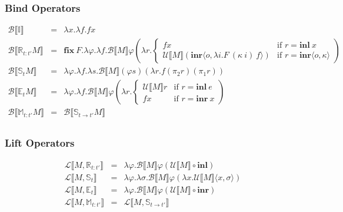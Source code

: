 \documentclass{article}[11pt]
\begin{document}
\subsubsection{Bind Operators}
\begin{eqnarray*}
\mathcal{B}\llbracket{}\mathbb{I}\rrbracket &=& \lambda x . \lambda f . f x\\
\mathcal{B}\llbracket{}\mathbb{R}_{t:t'}M\rrbracket &=& \mathbf{fix}~ F . \lambda \varphi . \lambda f . \mathcal{B}\llbracket{}M\rrbracket \varphi \left(\lambda r . \begin{cases}f x&\text{if } r = \mathbf{inl}~ x\\\mathcal{U}\llbracket{}M\rrbracket (\mathbf{inr} \langle o,\lambda i . F~ (\kappa~ i)~ f\rangle)&\text{if } r = \mathbf{inr} \langle{}o,\kappa\rangle\end{cases}\right)\\
\mathcal{B}\llbracket{}\mathbb{S}_t M\rrbracket &=& \lambda \varphi . \lambda f . \lambda s . \mathcal{B}\llbracket{}M\rrbracket (\varphi s) (\lambda r . f (\pi_2r) (\pi_1 r))\\
\mathcal{B}\llbracket{}\mathbb{E}_t M\rrbracket &=& \lambda \varphi . \lambda f . \mathcal{B}\llbracket{}M\rrbracket \varphi \left(\lambda r . \begin{cases}\mathcal{U}\llbracket{}M\rrbracket{}r&\text{if } r = \mathbf{inl}~ e\\f x&\text{if } r = \mathbf{inr}~ x\end{cases}\right)\\
\mathcal{B}\llbracket{}\mathbb{M}_{t:t'} M\rrbracket &=& \mathcal{B}\llbracket{}\mathbb{S}_{t\rightarrow{}t'} M\rrbracket\\
\end{eqnarray*}

\subsubsection{Lift Operators}
\begin{eqnarray*}
\mathcal{L}\llbracket{}M,\mathbb{R}_{t:t'}\rrbracket &=& \lambda \varphi . \mathcal{B}\llbracket{}M\rrbracket \varphi (\mathcal{U}\llbracket{}M\rrbracket \circ \mathbf{inl})\\
\mathcal{L}\llbracket{}M,\mathbb{S}_t\rrbracket &=& \lambda \varphi . \lambda \sigma . \mathcal{B}\llbracket{}M\rrbracket \varphi (\lambda x . \mathcal{U}\llbracket{}M\rrbracket\langle{}x,\sigma\rangle)\\
\mathcal{L}\llbracket{}M,\mathbb{E}_t\rrbracket &=& \lambda \varphi . \mathcal{B}\llbracket{}M\rrbracket \varphi (\mathcal{U}\llbracket{}M\rrbracket \circ \mathbf{inr})\\
\mathcal{L}\llbracket{}M,\mathbb{M}_{t:t'}\rrbracket &=& \mathcal{L}\llbracket{}M,\mathbb{S}_{t\rightarrow{}t'}\rrbracket
\end{eqnarray*}
\end{document}
